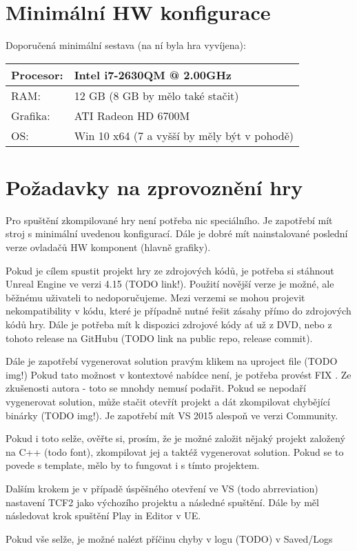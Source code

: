 

\appendix
{}

\renewcommand{\thesection}{\Alph{section}}




\section{Minimální HW konfigurace}

Doporučená minimální sestava (na ní byla hra vyvíjena): 

\begin{center}
	\begin{tabular} { | l | l |}
		\hline
		Procesor: 	&	Intel i7-2630QM @ 2.00GHz \\	\hline
		RAM:		&	12 GB	(8 GB by mělo také stačit) \\	\hline
		Grafika:	&	ATI Radeon HD 6700M \\	\hline
		OS:		&	Win 10 x64  (7 a vyšší by měly být v pohodě) \\
		\hline
	\end{tabular}
\end{center}

\newpage

\section{Požadavky na zprovoznění hry}


Pro spuštění zkompilované hry není potřeba nic speciálního. Je zapotřebí mít stroj s minimální uvedenou konfigurací. Dále je dobré mít nainstalované poslední verze ovladačů HW komponent (hlavně grafiky). 

Pokud je cílem spustit projekt hry ze zdrojových kódů, je potřeba si stáhnout Unreal Engine ve verzi 4.15 (TODO link!). Použití novější verze je možné, ale běžnému uživateli to nedoporučujeme. Mezi verzemi se mohou projevit nekompatibility v kódu, které je případně nutné řešit zásahy přímo do zdrojových kódů hry.
Dále je potřeba mít k dispozici zdrojové kódy ať už z DVD, nebo z tohoto release na GitHubu (TODO link na public repo, release commit).

Dále je zapotřebí vygenerovat solution pravým klikem na uproject file (TODO img!) Pokud tato možnost v kontextové nabídce není, je potřeba provést FIX . Ze zkušenosti autora - toto se mnohdy nemusí podařit. Pokud se nepodaří vygenerovat solution, může stačit otevřít projekt a dát zkompilovat chybějící binárky (TODO img!). Je zapotřebí mít VS 2015 alespoň ve verzi Community.

Pokud i toto selže, ověřte si, prosím, že je možné založit nějaký projekt založený na C++ (todo font), zkompilovat jej a taktéž vygenerovat solution. Pokud se to povede s template, mělo by to fungovat i s tímto projektem.


Dalším krokem je v případě úspěšného otevření ve VS (todo abrreviation) nastavení TCF2 jako výchozího projektu a následné spuštění. Dále by měl následovat krok spuštění Play in Editor v UE.


Pokud vše selže, je možné nalézt příčinu chyby v logu (TODO) v Saved/Logs